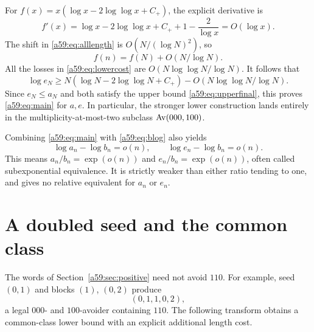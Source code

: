 \documentclass[11pt,letterpaper]{article}
\theoremstyle{remark}\newtheorem{remark}[theorem]{Remark}
\theoremstyle{remark}\newtheorem{wremark}{Remark}\renewcommand{\thewremark}{W\arabic{wremark}}
\theoremstyle{plain}\newtheorem{wcorollary}[wremark]{Corollary}
\begin{document}
For $f(x)=x(\log x-2\log\log x+C_+)$, the explicit derivative is
\[
 f'(x)=\log x-2\log\log x+C_++1-\frac2{\log x}=O(\log x).
\]
The shift in \eqref{a59:eq:alllength} is $O(N/(\log N)^2)$, so
\[
 f(n)=f(N)+O(N/\log N).
\]
All the losses in \eqref{a59:eq:lowercost} are $O(N\log\log N/\log N)$. It follows that
\begin{equation}\label{a59:eq:lowerfinal}
 \log e_N\ge N(\log N-2\log\log N+C_+)
                  -O(N\log\log N/\log N).
\end{equation}
Since $e_N\le a_N$ and both satisfy the upper bound \eqref{a59:eq:upperfinal}, this proves \eqref{a59:eq:main} for $a,e$. In particular, the stronger lower construction lands entirely in the multiplicity-at-most-two subclass $\operatorname{Av}(000,100)$.

Combining \eqref{a59:eq:main} with \eqref{a59:eq:blog} also yields
\[
 \log a_n-\log b_n=o(n),\qquad \log e_n-\log b_n=o(n).
\]
This means $a_n/b_n=\exp(o(n))$ and $e_n/b_n=\exp(o(n))$, often called subexponential equivalence. It is strictly weaker than either ratio tending to one, and gives no relative equivalent for $a_n$ or $e_n$.
\section{A doubled seed and the common class}\label{a59:sec:common}
The words of Section~\ref{a59:sec:positive} need not avoid $110$. For example, seed $(0,1)$ and blocks $(1)$, $(0,2)$ produce
\[
 (0,1,1,0,2),
\]
a legal $000$- and $100$-avoider containing $110$. The following transform obtains a common-class lower bound with an explicit additional length cost.
\end{document}
